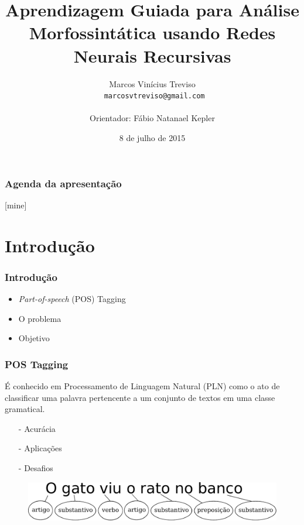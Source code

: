 \documentclass[10pt]{beamer}
\title{Aprendizagem Guiada para Análise Morfossintática usando Redes Neurais Recursivas}
\subtitle{}
\date{8 de julho de 2015}
\author[Treviso]{Marcos Vinícius Treviso\\\scriptsize\texttt{ marcosvtreviso@gmail.com}\\\\Orientador: Fábio Natanael Kepler\\}
\institute{Universidade Federal do Pampa}
\begin{document}
\maketitle

\begin{frame}
  \frametitle{Agenda da apresentação}
  [mine]
  \tableofcontents[hideallsubsections]
\end{frame}


\section{Introdução}


\begin{frame}[fragile]
  \frametitle{Introdução}

  \begin{itemize}
      \item \textit{Part-of-speech} (POS) Tagging 
      \item O problema
      \item Objetivo
    \end{itemize}


\end{frame}


\begin{frame}[fragile]
  \frametitle{POS Tagging}

  É conhecido em Processamento de Linguagem Natural (PLN) como o ato de classificar uma palavra pertencente a um conjunto de textos em uma classe gramatical.

 \begin{itemize}
      \item[-] Acurácia
      \item[-] Aplicações
      \item[-] Desafios
    \end{itemize}

  
    \begin{figure}[htb]
    \begin{center}
        \includegraphics[scale=0.5]{img/exemploclassificacao.pdf}
    \end{center}
  \end{figure}

\end{frame}
\end{document}
